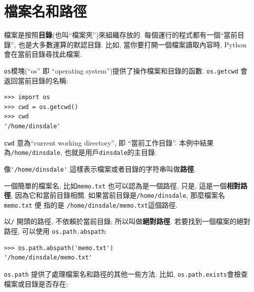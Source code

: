 \documentclass[10pt]{book}
\begin{document}



\section{檔案名和路徑}
\label{paths}

檔案是按照{\bf 目錄}(也叫``檔案夾'')來組織存放的. 
每個運行的程式都有一個``當前目錄'', 也是大多數運算的默認目錄. 
比如, 當你要打開一個檔案讀取內容時, Python會在當前目錄尋找此檔案. 

{\tt os}模塊(``os'' 即 ``operating system'')提供了操作檔案和目錄的函數. 
{\tt os.getcwd} 會返回當前目錄的名稱:

\begin{verbatim}
>>> import os
>>> cwd = os.getcwd()
>>> cwd
'/home/dinsdale'
\end{verbatim}
%
{\tt cwd} 意為``current working directory'', 即 ``當前工作目錄''. 
本例中結果為{\tt /home/dinsdale}, 也就是用戶{\tt dinsdale}的主目錄. 

像\verb"'/home/dinsdale'" 這樣表示檔案或者目錄的字符串叫做{\bf 路徑}. 

一個簡單的檔案名, 比如{\tt memo.txt} 也可以認為是一個路徑, 
只是, 這是一個{\bf 相對路徑}, 因為它和當前目錄相關. 
如果當前目錄是{\tt /home/dinsdale}, 那麼檔案名{\tt memo.txt} 便
指的是 {\tt /home/dinsdale/memo.txt}這個路徑. 
 
 

以{\tt /} 開頭的路徑, 不依賴於當前目錄;
所以叫做{\bf 絕對路徑}.
若要找到一個檔案的絕對路徑, 可以使用 {\tt os.path.abspath}:

\begin{verbatim}
>>> os.path.abspath('memo.txt')
'/home/dinsdale/memo.txt'
\end{verbatim}
%
{\tt os.path} 提供了處理檔案名和路徑的其他一些方法. 
比如, {\tt os.path.exists}會檢查檔案或目錄是否存在:
\end{document}
